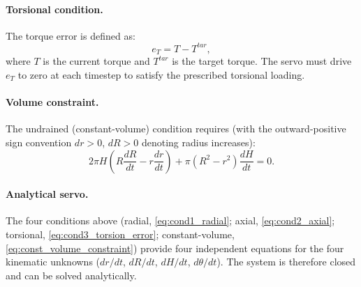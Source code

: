 \paragraph{Torsional condition.}
The torque error is defined as:
\begin{equation}
e_T = T - T^{tar},
\label{eq:cond3_torsion_error}
\end{equation}
where $T$ is the current torque and $T^{tar}$ is the target torque. The servo must drive $e_T$ to zero at each timestep to satisfy the prescribed torsional loading.

\paragraph{Volume constraint.}
The undrained (constant-volume) condition requires (with the outward-positive sign convention $dr>0$, $dR>0$ denoting radius increases):
\begin{equation}
2\pi H\!\left(R\frac{dR}{dt} - r\frac{dr}{dt}\right) + \pi\!\left(R^2-r^2\right)\frac{dH}{dt} = 0.
\label{eq:const_volume_constraint}
\end{equation}

\paragraph{Analytical servo.}
The four conditions above (radial, \cref{eq:cond1_radial}; axial, \cref{eq:cond2_axial}; torsional, \cref{eq:cond3_torsion_error}; constant-volume, \cref{eq:const_volume_constraint}) provide four independent equations for the four kinematic unknowns ($dr/dt$, $dR/dt$, $dH/dt$, $d\theta/dt$). The system is therefore closed and can be solved analytically.

